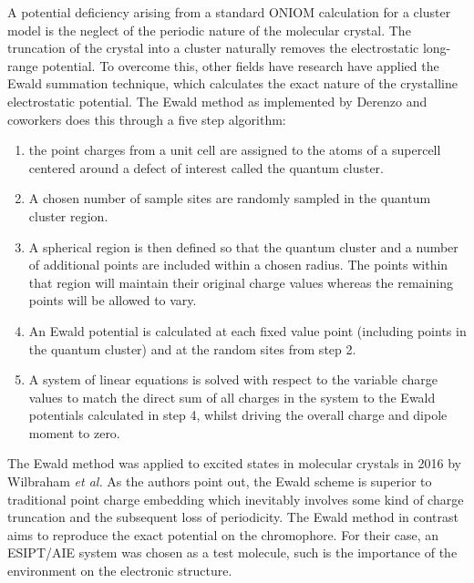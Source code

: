 A potential deficiency arising from a standard ONIOM calculation for a cluster model is the neglect of the periodic nature of the molecular crystal. The truncation of the crystal into a cluster naturally removes the electrostatic long-range potential. To overcome this, other fields have research have applied the Ewald summation technique, which calculates the exact nature of the crystalline electrostatic potential.\cite{Weber2010,Stueber2001b} The Ewald method as implemented by Derenzo and coworkers does this through a five step algorithm:\cite{Klintenberg2000,Derenzo2000}  
\begin{enumerate}
    \item the point charges from a unit cell are assigned to the atoms of a supercell centered around a defect of interest called the quantum cluster.
    \item A chosen number of sample sites are randomly sampled in the quantum cluster region.
    \item A spherical region is then defined so that the quantum cluster and a number of additional points are included within a chosen radius. The points within that region will maintain their original charge values whereas the remaining points will be allowed to vary.
    \item An Ewald potential is calculated at each fixed value point (including points in the quantum cluster) and at the random sites from step 2.
    \item A system of linear equations is solved with respect to the variable charge values to match the direct sum of all charges in the system to the Ewald potentials calculated in step 4, whilst driving the overall charge and dipole moment to zero.
\end{enumerate}
The Ewald method was applied to excited states in molecular crystals in 2016 by Wilbraham \textit{et al.}\cite{Wilbraham2016} As the authors point out, the Ewald scheme is superior to traditional point charge embedding which inevitably involves some kind of charge truncation and the subsequent loss of periodicity. The Ewald method in contrast aims to reproduce the exact potential on the chromophore. For their case, an ESIPT/AIE system was chosen as a test molecule, such is the importance of the environment on the electronic structure. 

